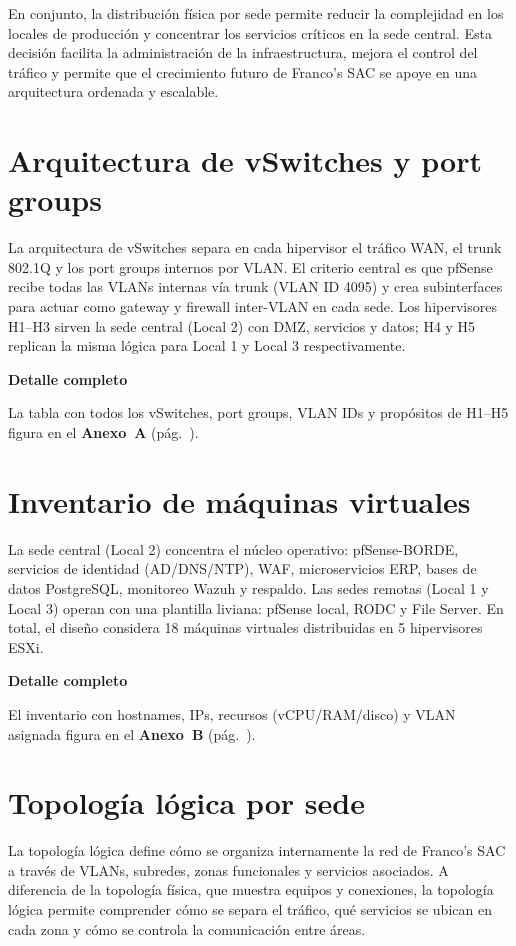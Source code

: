 \documentclass[11pt, a4paper, oneside]{report}
\newenvironment{notabox}[1]{%
  \begin{lrbox}{\notaboxsb}%
  \begin{minipage}{\dimexpr\textwidth-2\fboxsep\relax}%
  \vspace{4pt}\textcolor{upeu_dark}{\textbf{#1}}\\[2pt]\small%
}{%
  \vspace{4pt}%
  \end{minipage}%
  \end{lrbox}%
  \vspace{6pt}\par\noindent\colorbox{upeu_light}{\usebox{\notaboxsb}}\par\vspace{6pt}%
}
\begin{document}
En conjunto, la distribución física por sede permite reducir la complejidad en los locales de producción y concentrar los servicios críticos en la sede central. Esta decisión facilita la administración de la infraestructura, mejora el control del tráfico y permite que el crecimiento futuro de Franco's SAC se apoye en una arquitectura ordenada y escalable.

\section{Arquitectura de vSwitches y port groups}

La arquitectura de vSwitches separa en cada hipervisor el tráfico WAN, el trunk 802.1Q y los port groups internos por VLAN. El criterio central es que pfSense recibe todas las VLANs internas vía trunk (VLAN ID 4095) y crea subinterfaces para actuar como gateway y firewall inter-VLAN en cada sede. Los hipervisores H1--H3 sirven la sede central (Local 2) con DMZ, servicios y datos; H4 y H5 replican la misma lógica para Local 1 y Local 3 respectivamente.

\begin{notabox}{Detalle completo}
La tabla con todos los vSwitches, port groups, VLAN IDs y propósitos de H1--H5 figura en el \textbf{Anexo~A} (pág.~\pageref{anex:vswitches}).
\end{notabox}
\section{Inventario de máquinas virtuales}

La sede central (Local 2) concentra el núcleo operativo: pfSense-BORDE, servicios de identidad (AD/DNS/NTP), WAF, microservicios ERP, bases de datos PostgreSQL, monitoreo Wazuh y respaldo. Las sedes remotas (Local 1 y Local 3) operan con una plantilla liviana: pfSense local, RODC y File Server. En total, el diseño considera 18 máquinas virtuales distribuidas en 5 hipervisores ESXi.

\begin{notabox}{Detalle completo}
El inventario con hostnames, IPs, recursos (vCPU/RAM/disco) y VLAN asignada figura en el \textbf{Anexo~B} (pág.~\pageref{anex:vms}).
\end{notabox}
\section{Topología lógica por sede}

La topología lógica define cómo se organiza internamente la red de Franco's SAC a través de VLANs, subredes, zonas funcionales y servicios asociados. A diferencia de la topología física, que muestra equipos y conexiones, la topología lógica permite comprender cómo se separa el tráfico, qué servicios se ubican en cada zona y cómo se controla la comunicación entre áreas.
\end{document}
